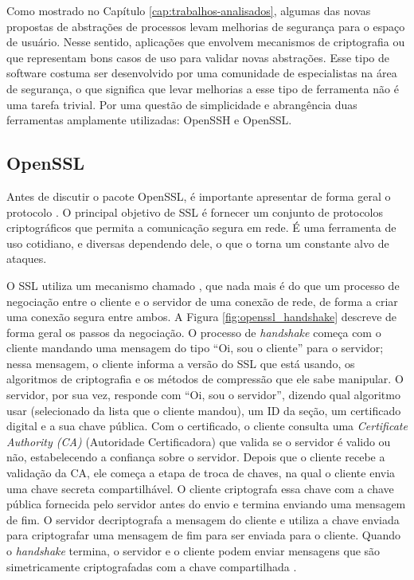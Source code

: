 Como mostrado no Capítulo \ref{cap:trabalhos-analisados}, algumas das novas
propostas de abstrações de processos levam melhorias de segurança para o espaço
de usuário. Nesse sentido, aplicações que envolvem mecanismos de criptografia ou
que  representam bons casos de uso para
validar novas abstrações. Esse tipo de software costuma ser desenvolvido por
uma comunidade de especialistas na área de segurança, o que significa que levar
melhorias a esse tipo de ferramenta não é uma tarefa trivial.  Por uma questão de simplicidade e
abrangência  duas ferramentas amplamente utilizadas: OpenSSH e
OpenSSL.

\subsection{OpenSSL}
\label{sec:openssl}

Antes de discutir o pacote OpenSSL, é importante apresentar de forma geral o
protocolo . O principal objetivo de
SSL é fornecer um conjunto de protocolos criptográficos que permita a
comunicação segura em rede. É uma ferramenta de uso
cotidiano, e diversas dependendo dele,
o que o torna um constante alvo de ataques.

O SSL utiliza um mecanismo chamado , que
nada mais é do que um processo de negociação entre o cliente e o servidor de uma conexão de rede, de
forma a criar uma conexão segura entre ambos. A Figura
\ref{fig:openssl_handshake} descreve de forma geral os passos da negociação. O
processo de \emph{handshake} começa com o cliente mandando uma mensagem do
tipo ``Oi, sou o cliente'' para o servidor; nessa mensagem, o cliente informa a
versão do SSL que está usando, os algoritmos de criptografia e os métodos de
compressão que ele sabe manipular. O servidor, por sua vez, responde com ``Oi, sou o
servidor'', dizendo qual algoritmo usar (selecionado da lista que o cliente
mandou), um ID da seção, um certificado digital e a sua chave pública. Com o
certificado, o cliente consulta uma \emph{Certificate Authority (CA)}
(Autoridade Certificadora) que valida se o servidor é valido ou não,
estabelecendo a confiança sobre o servidor. Depois que o cliente recebe a
validação da CA, ele começa a etapa de troca de chaves, na qual o cliente envia
uma chave secreta compartilhável. O cliente criptografa essa chave com a chave
pública fornecida pelo servidor antes do envio e termina enviando uma mensagem de
fim. O servidor decriptografa a mensagem do cliente e utiliza a chave enviada
para criptografar uma mensagem de fim para ser enviada para o cliente. Quando
o \emph{handshake} termina, o servidor e o cliente podem enviar mensagens que
são simetricamente criptografadas com a chave compartilhada \citep{openssl}.

